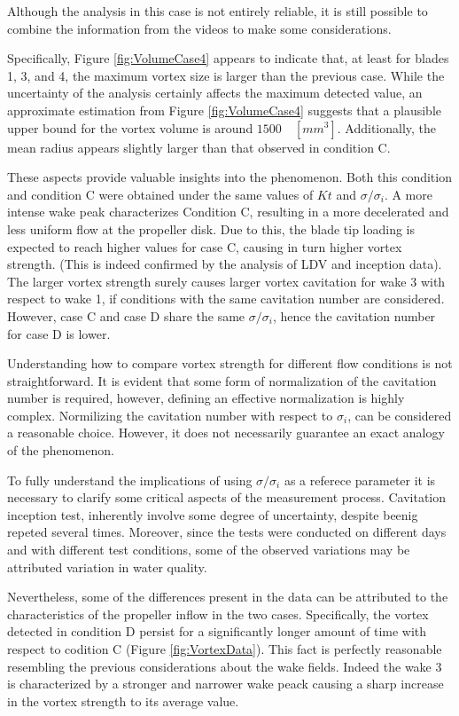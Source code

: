 \begin{itemize}
    Although the analysis in this case is not entirely reliable, it is still possible to combine the information from the videos to make some considerations.

    Specifically, Figure \ref{fig:VolumeCase4} appears to indicate that, at least for blades 1, 3, and 4, the maximum vortex size is larger than the previous case. While the uncertainty of the analysis certainly affects the maximum detected value, an approximate estimation from Figure \ref{fig:VolumeCase4} suggests that a plausible upper bound for the vortex volume is around $1500 \quad [mm^3]$.
    Additionally, the mean radius appears slightly larger than that observed in condition C.

    These aspects provide valuable insights into the phenomenon. Both this condition and condition C were obtained under the same values of $Kt$ and $\sigma/\sigma_i$. A more intense wake peak characterizes Condition C, resulting in a more decelerated and less uniform flow at the propeller disk. 
    Due to this, the blade tip loading is expected to reach higher values for case C, causing in turn higher vortex strength. (This is indeed confirmed by the analysis of LDV and inception data). The larger vortex strength surely causes larger vortex cavitation for wake 3 with respect to wake 1, if conditions with the same cavitation number are considered. However, case C and case D share the same $\sigma/\sigma_i$, hence the cavitation number for case D is lower.

    Understanding how to compare vortex strength for different flow conditions is not straightforward.    
    It is evident that some form of normalization of the cavitation number is required, however, defining an effective normalization is highly complex. 
    Normilizing the cavitation number with respect to $\sigma_i$, can be considered a reasonable choice. However, it does not necessarily guarantee an exact analogy of the phenomenon.

    To fully understand the implications of using $\sigma/\sigma_i$ as a referece parameter it is necessary to clarify some critical aspects of the measurement process. 
    Cavitation inception test, inherently involve some degree of uncertainty, despite beenig repeted several times. Moreover, since the tests were conducted on different days and with different test conditions, some of the observed variations may be attributed variation in water quality.

    Nevertheless, some of the differences present in the data can be attributed to the characteristics of the propeller inflow in the two cases.
    Specifically, the vortex detected in condition D persist for a significantly longer amount of time with respect to codition C (Figure \ref{fig:VortexData}).  
    This fact is perfectly reasonable resembling the previous considerations about the wake fields. Indeed the wake 3 is characterized by a stronger and narrower wake peack causing a sharp increase in the vortex strength to its average value.


\end{itemize}
